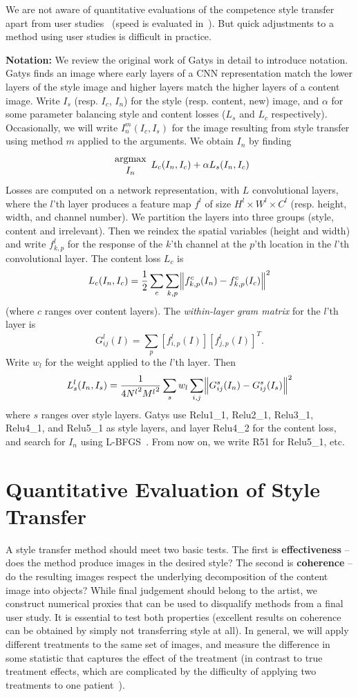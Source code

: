 \documentclass[runningheads]{llncs}
\begin{document}
We are not aware of quantitative evaluations of the competence style transfer apart from user studies~\cite{} (speed is
evaluated in~\cite{}).  But quick adjustments to a method using user studies is difficult in practice.  

{\bf Notation:} We review the original work of Gatys \ea in detail to introduce notation.
Gatys \ea \cite{gatys2016image} finds an image where early layers of a CNN representation match the lower layers of the style image and higher layers match the higher layers of a content image.  Write $I_{s}$ (resp. $I_{c}$, $I_{n}$)  for the style (resp. content, new) image,
and $\alpha$ for some parameter balancing style and content losses ($L_s$ and $L_c$ respectively).  Occasionally, we
will write $I_n^m(I_c, I_s)$ for the image resulting from style transfer using method $m$ applied to the arguments.
We obtain $I_{n}$ by finding
\[
{\begin{array}{c}\mbox{argmax}\\{{I_{n}}}\end{array}} L_c(I_{n}, I_{c})+\alpha L_s(I_{n}, I_{c})
\]
Losses are computed on a network representation, with $L$ convolutional layers, where the $l$'th layer
produces a feature map $f^l$ of size $H^l \times W^l \times C^l$ (resp. height, width, and channel number). We partition
the layers into three groups (style, content and irrelevant). Then we reindex the spatial variables (height and width) and
write $f^l_{k,p}$ for the response of the $k$'th channel at the  $p$'th location in the $l$'th convolutional layer. The
content loss $L_c$ is 
\[
L_c(I_{n}, I_{c}) = \frac{1}{2}\sum_{c} \sum_{k,p} \norm{f^c_{k,p}(I_{n}) - f^c_{k,p}(I_{c})}^2
\]
(where $c$ ranges over content layers). The {\em within-layer gram
  matrix} for the $l$'th layer is
\[
G_{ij}^l(I) = \sum_p \left[f_{i,p}^l(I)\right]\left[f_{j,p}^l(I)\right]^{T}.
\]
Write $w_l$ for the weight applied to the $l$'th layer.  Then 
\[
L_s^l(I_{n}, I_{s}) = \frac{1}{4{N^l}^2{M^l}^2}\sum_{s}w_l \sum_{i,j}\norm{G^s_{ij}(I_{n})-G^s_{ij}(I_{s})}^2
\]
where $s$ ranges over style layers. Gatys \ea use Relu1\_1, Relu2\_1, Relu3\_1, Relu4\_1, and Relu5\_1 as style layers, and layer Relu4\_2 
for the content loss, and search for $I_{n}$ using L-BFGS~\cite{liu1989limited}.  From now on, we write R51 for Relu5\_1, etc. 

\section{Quantitative Evaluation of Style Transfer}

A style transfer method should meet two basic tests.  The first is {\bf effectiveness} -- does the
method produce images in the desired style? The second is {\bf coherence} -- do the resulting images respect the
underlying decomposition of the content image into objects?   While final judgement should belong to the artist, we
construct numerical proxies that can be used to disqualify methods from a final user study. It is essential to test both
properties (excellent results on coherence can be obtained by simply not transferring style at all).
In general, we will apply different treatments to the same set of
images, and measure the difference in some statistic that captures the
effect of the treatment (in contrast to true treatment effects, which are complicated by the difficulty of applying two
treatments to one patient~\cite{}).   
\end{document}
